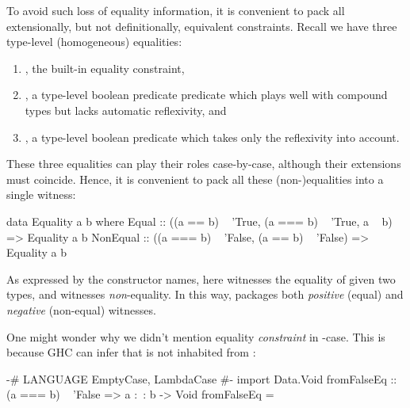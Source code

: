 \documentclass[demotion-paper.tex]{subfiles}
\begin{document}
To avoid such loss of equality information, it is convenient to pack all extensionally, but not definitionally, equivalent constraints.
Recall we have three type-level (homogeneous) equalities:
\begin{enumerate}
\item {}, the built-in equality constraint,
\item {}, a type-level boolean predicate predicate which plays well with compound types but lacks automatic reflexivity, and
\item {}, a type-level boolean predicate which takes only the reflexivity into account.
\end{enumerate}
These three equalities can play their roles case-by-case, although their extensions must coincide.
Hence, it is convenient to pack all these (non-)equalities into a single witness:

\begin{code}
data Equality a b where
  Equal :: 
    ((a == b) ~ 'True, 
     (a === b) ~ 'True, a ~ b) => Equality a b
  NonEqual
    :: ((a === b) ~ 'False, 
        (a == b) ~ 'False) => Equality a b
\end{code}

As expressed by the constructor names, here  witnesses the equality of given two types, and  witnesses \emph{non}-equality.
In this way,  packages both \emph{positive} (equal) and \emph{negative} (non-equal) witnesses.

One might wonder why we didn't mention equality \emph{constraint}  in -case.
This is because GHC can infer that  is not inhabited from :

\begin{code}
{-# LANGUAGE EmptyCase, LambdaCase #-}
import Data.Void
fromFalseEq :: (a === b) ~ 'False => a :~: b -> Void
fromFalseEq = \case {}
\end{code}
\end{document}
